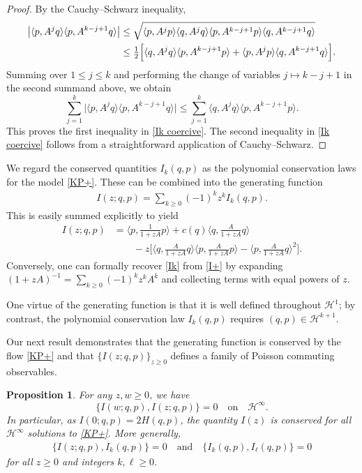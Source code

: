\documentclass{amsart}
\newcommand{\qtq}[1]{\quad\text{#1}\quad}
\newtheorem{proposition}[theorem]{Proposition}
\theoremstyle{definition}
\numberwithin{equation}{section}
\renewcommand{\H}{\mathcal H}
\newcommand{\la}{\langle}
\newcommand{\ra}{\rangle}
\begin{document}
\begin{proof}
By the Cauchy--Schwarz inequality,
\begin{align*}
\bigl| \langle p, A^{j} q\rangle \langle p, A^{k-j+1} q\rangle\bigr|
&\leq \sqrt{\la p, A^jp\ra \la q, A^j q\ra \la p, A^{k-j+1} p\ra\la q, A^{k-j+1} q\ra}\\
&\leq \tfrac12 \Bigl[\la q, A^jq\ra\la p, A^{k-j+1} p\ra+ \la p, A^jp\ra\la q, A^{k-j+1} q\ra  \Bigr].
\end{align*}
Summing over $1\leq j\leq k$ and performing the change of variables $j\mapsto k-j+1$ in the second summand above, we obtain
$$
\sum_{j=1}^k \bigl| \langle p, A^{j} q\rangle \langle p, A^{k-j+1} q\rangle\bigr|\leq \sum_{j=1}^k\la q, A^jq\ra\la p, A^{k-j+1} p\ra.
$$
This proves the first inequality in \eqref{Ik coercive}. The second inequality in \eqref{Ik coercive} follows from a straightforward application of Cauchy--Schwarz.
\end{proof}

We regard the conserved quantities $I_k(q,p)$ as the polynomial conservation laws for the model \eqref{KP+}. These can be combined into the generating function 
\begin{align}\label{expansion}
I(z;q,p) = \sum_{k\geq 0}(-1)^kz^k I_k(q,p).
\end{align}
This is easily summed explicitly to yield
\begin{equation}\label{I+}
\begin{aligned}
I(z;q,p)&=\langle p,\tfrac{1}{1+zA}p\rangle+c(q)\langle q,\tfrac{A}{1+zA}q\rangle\\
&\qquad - z\bigl[\langle q,\tfrac{A}{1+ zA}q\rangle\langle p,\tfrac{A}{1+ zA}p\rangle-\langle p,\tfrac{A}{1+ zA}q\rangle^2\bigr].
\end{aligned}
\end{equation}
Conversely, one can formally recover \eqref{Ik} from \eqref{I+} by expanding $(1+zA)^{-1} = \sum_{k\geq 0} (-1)^kz^kA^k$ and collecting terms with equal powers of $z$.

One virtue of the generating function is that it is well defined throughout $\H^1$; by contrast, the polynomial conservation law $I_k(q,p)$ requires $(q,p)\in \H^{k+1}$.

Our next result demonstrates that the generating function is conserved by the flow \eqref{KP+} and that $\{I(z;q,p)\}_{z\geq 0}$ defines a family of Poisson commuting observables.  

\begin{proposition}\label{P:Poisson} For any $z,w \geq 0$, we have
\begin{equation}\label{Poisson commute}
\{I(w;q,p),I(z;q,p)\}=0 \qtq{on} \H^\infty.
\end{equation}
In particular, as $I(0;q,p) =2H(q,p)$, the quantity $I(z)$ is conserved for all $\H^\infty$ solutions to \eqref{KP+}. More generally,
\begin{align}\label{1153}
\{I(z;q,p),I_k(q,p)\}=0 \qtq{and} \{I_k(q,p),I_\ell(q,p)\}=0
\end{align}
for all $z\geq0$ and integers $k,\ell\geq 0$.
\end{proposition}
\end{document}
